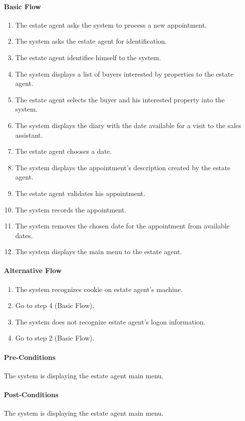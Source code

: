 \documentclass[a4paper,12pt]{article}
\begin{document}
\paragraph{Basic Flow}
\begin{enumerate}
\item The estate agent asks the system to process a new appointment.
\item The system asks the estate agent for identification.
\item The estate agent identifies himself to the system.
\item The system displays a list of buyers interested by properties to the estate agent.
\item The estate agent selects the buyer and his interested property into the system.
\item The system displays the diary with the date available for a visit to the sales assistant.
\item The estate agent chooses a date.
\item The system displays the appointment's description created by the estate agent.
\item The estate agent validates his appointment.
\item The system records the appointment.
\item The system removes the chosen date for the appointment from available dates.
\item The system displays the main menu to the estate agent.
\end{enumerate}
\paragraph{Alternative Flow}
\begin{enumerate}
\item The system recognizes cookie on estate agent's machine. 
\item Go to step 4 (Basic Flow).
\item The system does not recognize estate agent's logon information.
\item Go to step 2 (Basic Flow).
\end{enumerate}
\paragraph{Pre-Conditions}
The system is displaying the estate agent main menu.
\paragraph{Post-Conditions}
The system is displaying the estate agent main menu.
\end{document}
